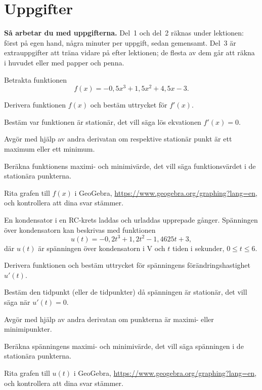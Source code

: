 
\section{Uppgifter}
\label{c13:sec:uppgifter}

\begin{aside}
\textbf{Så arbetar du med uppgifterna.} Del~1 och del~2 räknas under lektionen: först på egen
hand, några minuter per uppgift, sedan gemensamt. Del~3 är extrauppgifter att träna vidare på
efter lektionen; de flesta av dem går att räkna i huvudet eller med papper och penna.

\end{aside}


Betrakta funktionen
\[
  f(x) = -0{,}5x^3 + 1{,}5x^2 + 4{,}5x - 3.
\]
\begin{parts}
  \item Derivera funktionen $f(x)$ och bestäm uttrycket för $f'(x)$.
  \item Bestäm var funktionen är stationär, det vill säga lös ekvationen $f'(x) = 0$.
  \item Avgör med hjälp av andra derivatan om respektive stationär punkt är ett maximum eller
    ett minimum.
  \item Beräkna funktionens maximi- och minimivärde, det vill säga funktionsvärdet i de
    stationära punkterna.
  \item Rita grafen till $f(x)$ i GeoGebra, \url{https://www.geogebra.org/graphing?lang=en}, och
    kontrollera att dina svar stämmer.
\end{parts}

En kondensator i en RC-krets laddas och urladdas upprepade gånger. Spänningen över kondensatorn
kan beskrivas med funktionen
\[
  u(t) = -0{,}2t^3 + 1{,}2t^2 - 1{,}4625t + 3,
\]
där $u(t)$ är spänningen över kondensatorn i V och $t$ tiden i sekunder, $0 \leq t \leq 6$.
\begin{parts}
  \item Derivera funktionen och bestäm uttrycket för spänningens förändringshastighet $u'(t)$.
  \item Bestäm den tidpunkt (eller de tidpunkter) då spänningen är stationär, det vill säga när
    $u'(t) = 0$.
  \item Avgör med hjälp av andra derivatan om punkterna är maximi- eller minimipunkter.
  \item Beräkna spänningens maximi- och minimivärde, det vill säga spänningen i de stationära
    punkterna.
  \item Rita grafen till $u(t)$ i GeoGebra, \url{https://www.geogebra.org/graphing?lang=en}, och
    kontrollera att dina svar stämmer.
\end{parts}

